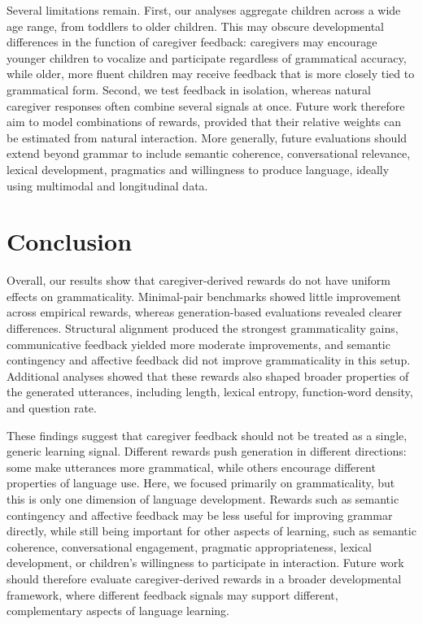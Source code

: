 Several limitations remain. First, our analyses aggregate children across a wide age range, from toddlers to older children. This may obscure developmental differences in the function of caregiver feedback: caregivers may encourage younger children to vocalize and participate regardless of grammatical accuracy, while older, more fluent children may receive feedback that is more closely tied to grammatical form. Second, we test feedback in isolation, whereas natural caregiver responses often combine several signals at once. Future work therefore aim to model combinations of rewards, provided that their relative weights can be estimated from natural interaction. More generally, future evaluations should extend beyond grammar to include semantic coherence, conversational relevance, lexical development, pragmatics and willingness to produce language, ideally using multimodal and longitudinal data. 




\section{Conclusion}

Overall, our results show that caregiver-derived rewards do not have uniform effects on grammaticality. Minimal-pair benchmarks showed little improvement across empirical rewards, whereas generation-based evaluations revealed clearer differences. Structural alignment produced the strongest grammaticality gains, communicative feedback yielded more moderate improvements, and semantic contingency and affective feedback did not improve grammaticality in this setup. Additional analyses showed that these rewards also shaped broader properties of the generated utterances, including length, lexical entropy, function-word density, and question rate.

These findings suggest that caregiver feedback should not be treated as a single, generic learning signal. Different rewards push generation in different directions: some make utterances more grammatical, while others encourage different properties of language use. Here, we focused primarily on grammaticality, but this is only one dimension of language development. Rewards such as semantic contingency and affective feedback may be less useful for improving grammar directly, while still being important for other aspects of learning, such as semantic coherence, conversational engagement, pragmatic appropriateness, lexical development, or children’s willingness to participate in interaction. Future work should therefore evaluate caregiver-derived rewards in a broader developmental framework, where different feedback signals may support different, complementary aspects of language learning.

